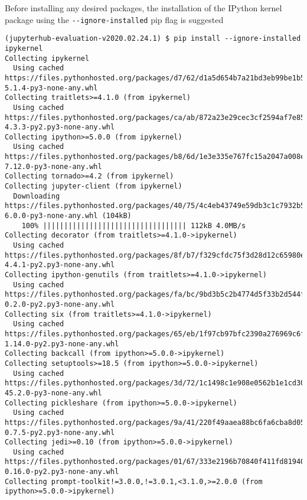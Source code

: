 \documentclass[11pt,a4paper]{article}
\begin{document}
Before installing any desired packages, the installation of the IPython kernel package using the \verb|--ignore-installed| pip flag is suggested
%
\begin{verbatim}
(jupyterhub-evaluation-v2020.02.24.1) $ pip install --ignore-installed ipykernel
Collecting ipykernel
  Using cached https://files.pythonhosted.org/packages/d7/62/d1a5d654b7a21bd3eb99be1b59a608cc18a7a08ed88495457a87c40a0495/ipykernel-5.1.4-py3-none-any.whl
Collecting traitlets>=4.1.0 (from ipykernel)
  Using cached https://files.pythonhosted.org/packages/ca/ab/872a23e29cec3cf2594af7e857f18b687ad21039c1f9b922fac5b9b142d5/traitlets-4.3.3-py2.py3-none-any.whl
Collecting ipython>=5.0.0 (from ipykernel)
  Using cached https://files.pythonhosted.org/packages/b8/6d/1e3e335e767fc15a2047a008e27df31aa8bcf11c6f3805d03abefc69aa88/ipython-7.12.0-py3-none-any.whl
Collecting tornado>=4.2 (from ipykernel)
Collecting jupyter-client (from ipykernel)
  Downloading https://files.pythonhosted.org/packages/40/75/4c4eb43749e59db3c1c7932b50eaf8c4b8219b1b5644fe379ea796f8dbe5/jupyter_client-6.0.0-py3-none-any.whl (104kB)
    100% |||||||||||||||||||||||||||||||||| 112kB 4.0MB/s
Collecting decorator (from traitlets>=4.1.0->ipykernel)
  Using cached https://files.pythonhosted.org/packages/8f/b7/f329cfdc75f3d28d12c65980e4469e2fa373f1953f5df6e370e84ea2e875/decorator-4.4.1-py2.py3-none-any.whl
Collecting ipython-genutils (from traitlets>=4.1.0->ipykernel)
  Using cached https://files.pythonhosted.org/packages/fa/bc/9bd3b5c2b4774d5f33b2d544f1460be9df7df2fe42f352135381c347c69a/ipython_genutils-0.2.0-py2.py3-none-any.whl
Collecting six (from traitlets>=4.1.0->ipykernel)
  Using cached https://files.pythonhosted.org/packages/65/eb/1f97cb97bfc2390a276969c6fae16075da282f5058082d4cb10c6c5c1dba/six-1.14.0-py2.py3-none-any.whl
Collecting backcall (from ipython>=5.0.0->ipykernel)
Collecting setuptools>=18.5 (from ipython>=5.0.0->ipykernel)
  Using cached https://files.pythonhosted.org/packages/3d/72/1c1498c1e908e0562b1e1cd30012580baa7d33b5b0ffdbeb5fde2462cc71/setuptools-45.2.0-py3-none-any.whl
Collecting pickleshare (from ipython>=5.0.0->ipykernel)
  Using cached https://files.pythonhosted.org/packages/9a/41/220f49aaea88bc6fa6cba8d05ecf24676326156c23b991e80b3f2fc24c77/pickleshare-0.7.5-py2.py3-none-any.whl
Collecting jedi>=0.10 (from ipython>=5.0.0->ipykernel)
  Using cached https://files.pythonhosted.org/packages/01/67/333e2196b70840f411fd819407b4e98aa3150c2bd24c52154a451f912ef2/jedi-0.16.0-py2.py3-none-any.whl
Collecting prompt-toolkit!=3.0.0,!=3.0.1,<3.1.0,>=2.0.0 (from ipython>=5.0.0->ipykernel)

\end{verbatim}
\end{document}

